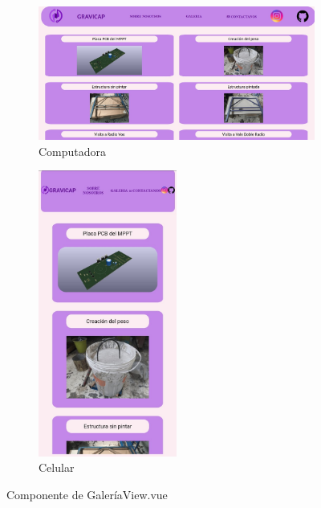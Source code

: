                     \begin{figure} [H]
                    \centering
                    \begin{subfigure}{0.5\textwidth}
                        \centering
                        \includegraphics[width=\textwidth]{Imagenes/Página Web/Computadora/Galería.jpg}
                        \caption{Computadora}
                        \label{fig:pw4.1}
                    \end{subfigure}
                    \hfill
                    \begin{subfigure}{0.4\textwidth}
                        \centering
                        \includegraphics[width=0.5\textwidth]{Imagenes/Página Web/Celular/Galería.jpg}
                        \caption{Celular}
                        \label{fig:pw4.2}
                    \end{subfigure}
                    \hfill
                            
                    \caption{Componente de GaleríaView.vue}
                    \label{fig:pw4}
                    \end{figure}

